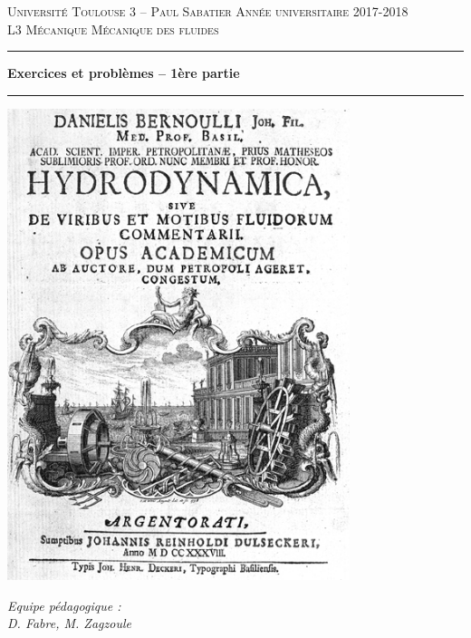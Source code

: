 \documentclass[10pt, a4paper]{article}
\begin{document}
                                          

\begin{titlepage}

\noindent
\textsc{Universit\'e Toulouse 3 -- Paul Sabatier \hfill Ann\'ee universitaire 2017-2018}
\\
\textsc{L3 M\'ecanique \hfill M\'ecanique des fluides}

\vspace{1cm}

\begin{center}
  \setlength{\unitlength}{1mm}
  \hrule height 1mm
  \vspace{6mm}
  \textbf{\LARGE Exercices et probl\`emes -- 1ère partie}
  \\ \vspace{5mm}
  \hrule height 1mm
  \vspace{2cm}
  \includegraphics[width=10cm]{bernoulli}
\end{center}

\vfill

\begin{flushright}
  \large{\textsl{Equipe p\'edagogique : \\
      D. Fabre, M. Zagzoule}}
\end{flushright}

\end{titlepage}

\tableofcontents

%
%
%
%




\end{document}
